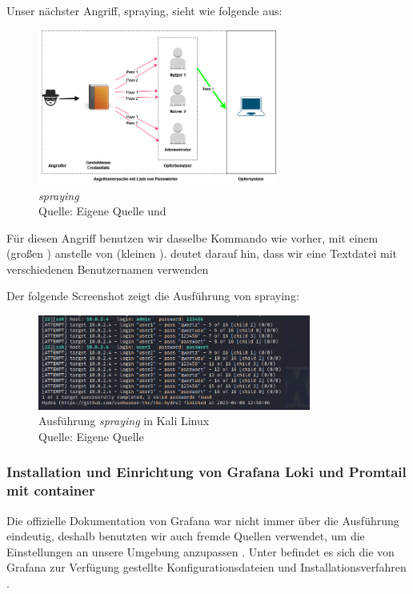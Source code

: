 Unser nächster Angriff, \gls{spraying}, sieht wie folgende aus:
\begin{figure}[H]
   \centering
   \includegraphics[width=0.7\textwidth]{assets/Spraying.jpg}
   \caption{\textit{\gls{spraying}}\\Quelle: Eigene Quelle und \citep{Swathi_spraxy}}
   \centering
\end{figure}

Für diesen Angriff benutzen wir dasselbe Kommando wie vorher, mit einem  (großen ) anstelle von  (kleinen ).  deutet darauf hin, dass wir eine Textdatei mit verschiedenen Benutzernamen verwenden 

Der folgende Screenshot zeigt die Ausführung von \gls{spraying}:
\begin{figure}[H]
   \centering
   \includegraphics[width=0.8\textwidth]{assets/Spraying_Kali.png}
   \caption{Ausführung \textit{\gls{spraying}} in Kali Linux \\Quelle: Eigene Quelle}
   \centering
\end{figure}

\subsubsection{Installation und Einrichtung von Grafana Loki und Promtail mit \gls{container}}
Die offizielle Dokumentation von Grafana war nicht immer über die Ausführung eindeutig, deshalb benutzten wir auch fremde Quellen verwendet, um die Einstellungen an unsere Umgebung anzupassen \citep{Polinowski_PGL}. Unter befindet es sich die von Grafana zur Verfügung gestellte Konfigurationsdateien und Installationsverfahren \citep{GrafanaLoki_run}. 

